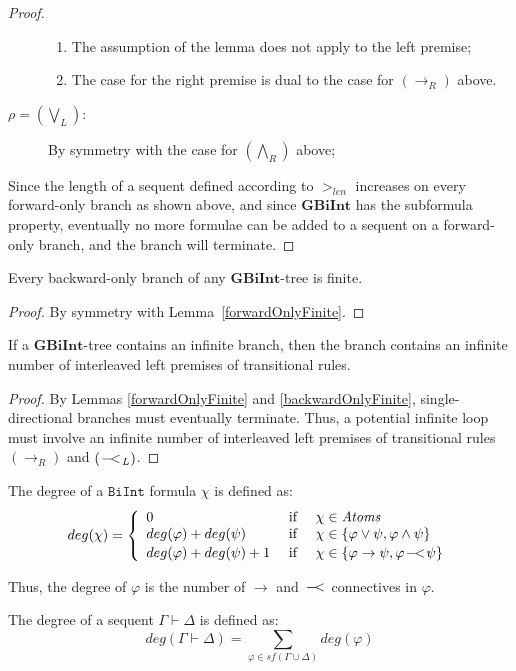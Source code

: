 \documentclass{llncs}
\numberwithin{equation}{section}
\newcommand{\Lg}[1]{\mathtt{#1}}
\newcommand{\ExAnd}{\wedge}
\newcommand{\ExOr}{\vee}
\newcommand{\ExImp}{\rightarrow}
\newcommand{\Atoms}{\mathit{Atoms}}
\newcommand{\sequent}{\vdash}
\newcommand{\Imp}{\rightarrow}
\newcommand{\WeakImp}{
\begin{picture}(10,10)
     \put(1,0){$-$}
     \put(7,0){$<$}
   \end{picture}
   \;\; 
}
\newcommand {\BiInt}{
        \Lg{BiInt}
}
\newcommand{\GBiInt}{\mathbf{GBiInt}}
\newcommand{\ImpRightRule}{({\Imp_R})}
\newcommand{\WeakImpLeftRule}{({\WeakImp_L})}
\newcommand{\SpecialRightRule}{({\bigwedge_R})}
\newcommand{\SpecialLeftRule}{({\bigvee_L})}
\begin{document}
\begin{proof}
\begin{description}
\begin{enumerate}
			\item The assumption of the lemma does not apply to the left premise;
			\item The case for the right premise is dual to the case for $\ImpRightRule$ above.
		\end{enumerate}		
	\item[\rm{$\rho = \SpecialLeftRule$:}] By symmetry with the case for $\SpecialRightRule$ above;			
\end{description}
Since the length of a sequent defined according to $>_{len}$ increases on every forward-only branch as shown above, and since $\GBiInt$ has the subformula property, eventually no more formulae can be added to a sequent on a forward-only branch, and the branch will terminate.
\end{proof}

\begin{lemma}\label{backwardOnlyFinite}
Every backward-only branch of any $\GBiInt$-tree is finite.
\end{lemma}
\begin{proof}
By symmetry with Lemma~\ref{forwardOnlyFinite}.
\end{proof}

\begin{lemma}\label{infMustBeInterleaved}
If a $\GBiInt$-tree contains an infinite branch, then the branch contains an infinite number of interleaved left premises of transitional rules.
\end{lemma}
\begin{proof}
By Lemmas \ref{forwardOnlyFinite} and \ref{backwardOnlyFinite}, single-directional branches must eventually terminate. Thus, a potential infinite loop must involve an infinite number of interleaved left premises of transitional rules $\ImpRightRule$ and $\WeakImpLeftRule$.
\end{proof}

\begin{definition}[Degree]
The degree of a $\BiInt$ formula $\chi$ is defined as:
$$
deg(\chi) = 
\left\{
\begin{array}{lcl}
	0																	&	\text{ if } & \chi \in \Atoms \\
	deg(\varphi) + deg(\psi)					&	\text{ if } & \chi \in \{ \varphi \ExOr \psi, \varphi \ExAnd \psi \} \\
	deg(\varphi) + deg(\psi) + 1			&	\text{ if } & \chi \in \{ \varphi \ExImp \psi, \varphi \WeakImp \psi \} \\
\end{array}
\right.		
$$

Thus, the degree of $\varphi$ is the number of $\ExImp$ and $\WeakImp$ connectives in $\varphi$.

The degree of a sequent $\Gamma \sequent \Delta$ is defined as:
$$deg(\Gamma \sequent \Delta) = \displaystyle {\sum_{\varphi \in sf(\Gamma \cup \Delta)}deg(\varphi)}$$
\end{definition}
\end{document}
